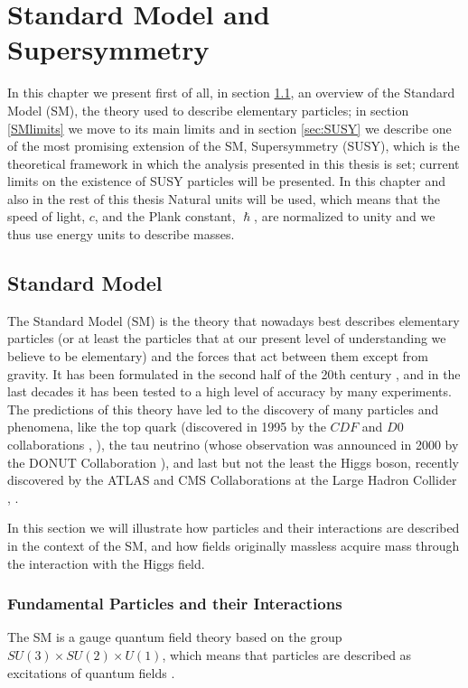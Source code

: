 \chapter{Standard Model and Supersymmetry}
\label{chap:SMSUSY}

In this chapter we present first of all, in section \ref{sec:SM}, an overview of the Standard Model (SM), the theory used to describe elementary particles; in section \ref{SMlimits} we move to its main limits and in section \ref{sec:SUSY} we describe one of the most promising extension of the SM, Supersymmetry (SUSY), which is the theoretical framework in which the analysis presented in this thesis is set; current limits on the existence of SUSY particles will be presented. In this chapter and also in the rest of this thesis Natural units will be used, which means that the speed of light, $c$, and the Plank constant, $\hslash$, are normalized to unity and we thus use energy units to describe masses.

\section{Standard Model}
\label{sec:SM}

The Standard Model (SM) is the theory that nowadays best describes elementary particles (or at least the particles that at our present level of understanding we believe to be elementary) and the forces that act between them except from gravity. It has been formulated in the second half of the 20th century \cite{oerter:sm}, and in the last decades it has been tested to a high level of accuracy by many experiments. The predictions of this theory have led to the discovery of many particles and phenomena, like the top quark (discovered in 1995 by the $CDF$ and $D0$ collaborations \cite{cdf:top}, \cite{D0:top}), the tau neutrino (whose observation was announced in 2000 by the DONUT Collaboration \cite{kodama:taunu}), and last but not the least the Higgs boson, recently discovered by the ATLAS and CMS Collaborations at the Large Hadron Collider \cite{atlas:higgs}, \cite{cms:higgs}. 

In this section we will illustrate how particles and their interactions are described in the context of the SM, and how fields originally massless acquire mass through the interaction with the Higgs field.


\subsection{Fundamental Particles and their Interactions}
\label{smint}
The SM is a gauge quantum field theory based on the group $SU(3) \times SU(2) \times U(1)$, which means that particles are described as excitations of quantum fields \cite{peskin:qft}.

